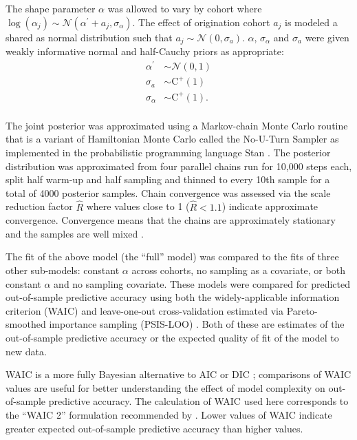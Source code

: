 \documentclass{article}
\begin{document}
The shape parameter \(\alpha\) was allowed to vary by cohort where \(\log(\alpha_{j}) \sim \mathcal{N}(\alpha^{\prime} + a_{j}, \sigma_{\alpha})\). The effect of origination cohort \(a_{j}\) is modeled a shared as normal distribution such that \(a_{j} \sim \mathcal{N}(0, \sigma_{a})\). \(\alpha\), \(\sigma_{\alpha}\) and \(\sigma_{a}\) were given weakly informative normal and half-Cauchy priors as appropriate: 
\begin{equation}
  \begin{aligned}
    \alpha^{\prime} &\sim \mathcal{N}(0, 1) \\
    \sigma_{a} &\sim \mathrm{C^{+}}(1) \\
    \sigma_{\alpha} &\sim \mathrm{C^{+}}(1). \\
  \end{aligned}
  \label{eq:alpha_prior}
\end{equation}


The joint posterior was approximated using a Markov-chain Monte Carlo routine that is a variant of Hamiltonian Monte Carlo called the No-U-Turn Sampler \citep{Hoffman2014} as implemented in the probabilistic programming language Stan \citep{2014stan}. The posterior distribution was approximated from four parallel chains run for 10,000 steps each, split half warm-up and half sampling and thinned to every 10th sample for a total of 4000 posterior samples. Chain convergence was assessed via the scale reduction factor \(\hat{R}\) where values close to 1 (\(\hat{R} < 1.1\)) indicate approximate convergence. Convergence means that the chains are approximately stationary and the samples are well mixed \citep{Gelman2013d}.

The fit of the above model (the ``full'' model) was compared to the fits of three other sub-models: constant \(\alpha\) across cohorts, no sampling as a covariate, or both constant \(\alpha\) and no sampling covariate. These models were compared for predicted out-of-sample predictive accuracy using both the widely-applicable information criterion (WAIC) and leave-one-out cross-validation estimated via Pareto-smoothed importance sampling (PSIS-LOO) \citep{Vehtari2015}. Both of these are estimates of the out-of-sample predictive accuracy or the expected quality of fit of the model to new data. 

WAIC is a more fully Bayesian alternative to AIC or DIC \citep{Watanabe2010a,Gelman2013d}; comparisons of WAIC values are useful for better understanding the effect of model complexity on out-of-sample predictive accuracy. The calculation of WAIC used here corresponds to the ``WAIC 2'' formulation recommended by \citet{Gelman2013d}. Lower values of WAIC indicate greater expected out-of-sample predictive accuracy than higher values.
\end{document}
